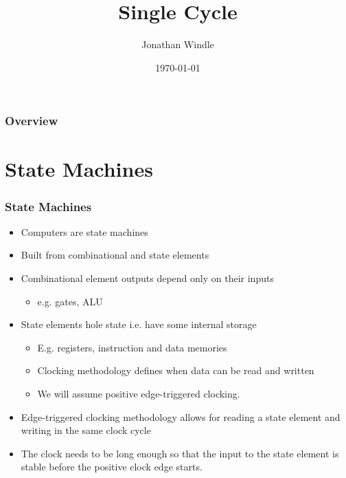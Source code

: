 \documentclass{beamer}
\title[Single Cycle]{Single Cycle} %
\author{Jonathan Windle} %
\institute[UEA] %
{
University of East Anglia \\ %
\medskip
\textit{J.Windle@uea.ac.uk} %
}
\date{\today} %
\begin{document}
\begin{frame}
\titlepage %
\end{frame}

\begin{frame}[allowframebreaks]
\frametitle{Overview} %
\tableofcontents %
\end{frame}

\section{State Machines}
\begin{frame}
\frametitle{State Machines}
\begin{itemize}
\item Computers are state machines
\item Built from combinational and state elements
\item Combinational element outputs depend only on their inputs
\begin{itemize}
\item e.g. gates, ALU
\end{itemize}
\item State elements hole state i.e. have some internal storage
\begin{itemize}
\item E.g. registers, instruction and data memories
\item {\color{red}Clocking methodology} defines when data can be read and written
\item We will assume {\color{green}positive edge-triggered} clocking.
\end{itemize}
\item Edge-triggered clocking methodology allows for reading a state element and writing in the same clock cycle
\item The clock needs to be long enough so that the input to the state element is stable before the positive clock edge starts.
\end{itemize}
\end{frame}
\end{document}
